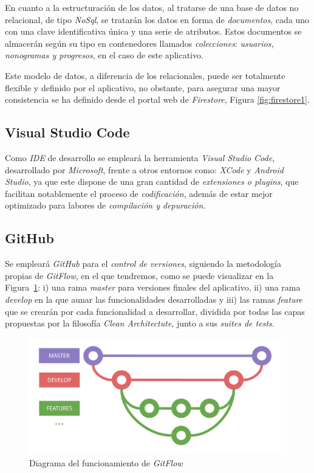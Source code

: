 En cuanto a la estructuración de los datos, al tratarse de una base de datos no relacional,
de tipo \textit{NoSql}, se tratarán los datos en forma de \textit{documentos}, cada uno con una clave identificativa única y una
serie de atributos. Estos documentos se almacerán según su tipo en contenedores llamados \textit{colecciones}:
\textit{usuarios, nonogramas y progresos}, en el caso de este aplicativo.

Este modelo de datos, a diferencia de los relacionales, puede ser totalmente flexible y definido por el aplicativo, no obstante,
para asegurar una mayor consistencia se ha definido desde el portal web de \textit{Firestore}, Figura \ref{fig:firestore1}.

  \subsection{Visual Studio Code}
Como \textit{IDE} de desarrollo se empleará la herramienta \textit{Visual Studio Code}, desarrollado por
\textit{Microsoft}, frente a otros entornos como: \textit{XCode} y \textit{Android Studio}, ya que este dispone
de una gran cantidad de \textit{extensiones o plugins}, que facilitan notablemente el proceso de \textit{codificación},
además de estar mejor optimizado para labores de \textit{compilación y depuración.}

\subsection{GitHub}
Se empleará \textit{GitHub} para el \textit{control de versiones}, siguiendo la metodología propias de 
\textit{GitFlow}, en el que tendremos, como se puede visualizar en la Figura~\ref{fig:gitflow1}:
i) una rama \textit{master} para versiones finales del aplicativo,
ii) una rama \textit{develop} en la que aunar las funcionalidades desarrolladas y iii) las ramas
\textit{feature} que se crearán por cada funcionalidad a desarrollar, dividida por todas las capas propuestas
por la filosofía \textit{Clean Architectute}, junto a sus \textit{suites de tests}.

\begin{figure}[H]
    \centering
    \includegraphics[scale=0.6]{images/gitflow1.pdf}
    \caption{Diagrama del funcionamiento de \textit{GitFlow}}
    \label{fig:gitflow1}
  \end{figure}


